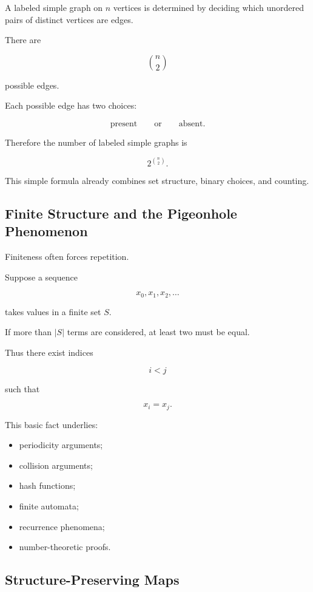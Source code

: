 A labeled simple graph on \(n\) vertices is determined by deciding
which unordered pairs of distinct vertices are edges.

There are

\[
\binom{n}{2}
\]

possible edges.

Each possible edge has two choices:

\[
\text{present}
\qquad\text{or}\qquad
\text{absent}.
\]

Therefore the number of labeled simple graphs is

\[
\boxed{
2^{\binom{n}{2}}.
}
\]

This simple formula already combines set structure, binary choices, and
counting.

\subsection{Finite Structure and the Pigeonhole Phenomenon}
\label{subsec:finite-structure-pigeonhole}

Finiteness often forces repetition.

Suppose a sequence

\[
x_0,x_1,x_2,\ldots
\]

takes values in a finite set \(S\).

If more than \(|S|\) terms are considered, at least two must be equal.

Thus there exist indices

\[
i<j
\]

such that

\[
x_i=x_j.
\]

This basic fact underlies:

\begin{itemize}
    \item periodicity arguments;
    \item collision arguments;
    \item hash functions;
    \item finite automata;
    \item recurrence phenomena;
    \item number-theoretic proofs.
\end{itemize}

\subsection{Structure-Preserving Maps}
\label{subsec:structure-preserving-maps}

